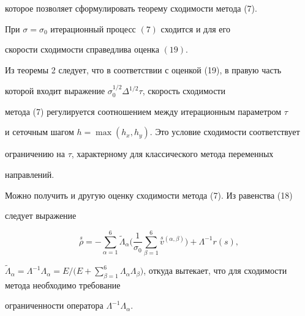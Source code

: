 которое позволяет сформулировать теорему сходимости метода (7).





\begin{thm}


При $\sigma=\sigma_0$ итерационный процесс $(7)$ сходится и для его


скорости сходимости справедлива оценка $(19)$.


\end{thm}





Из теоремы 2 следует, что в соответствии с оценкой (19), в правую часть


которой входит выражение $\sigma_0^{1/2}\Delta^{1/2}\tau$, скорость сходимости


метода (7) регулируется соотношением между итерационным параметром $\tau$


и сеточным шагом $h=\max(h_x,h_y)$. Это условие сходимости соответствует


ограничению на $\tau$, характерному для классического метода переменных


направлений.





Можно получить и другую оценку сходимости метода (7). Из равенства (18)


следует выражение


$$


\overset{s}{\rho}=-\sum_{\alpha=1}^6\widetilde\Lambda_\alpha\biggl(


\frac{1}{\sigma_0}\sum_{\beta=1}^6\overset{s}{v}{}^{(\alpha,\beta)}


\biggr)+\Lambda^{-1}r(s),


$$


$\widetilde\Lambda_\alpha=\Lambda^{-1}\Lambda_\alpha=


E\Big/\Big(E+\sum\limits_{\beta=1}^6\Lambda_\alpha\Lambda_\beta


\Big)$, откуда вытекает, что для сходимости метода необходимо требование


ограниченности оператора $\Lambda^{-1}\Lambda_\alpha$.





